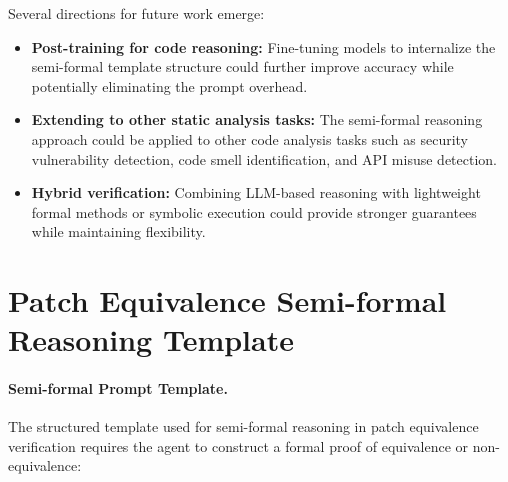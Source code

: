\documentclass[]{meta}
\begin{document}
Several directions for future work emerge:
\begin{itemize}


    \item \textbf{Post-training for code reasoning:} Fine-tuning models to internalize the semi-formal template structure could further improve accuracy while potentially eliminating the prompt overhead.

    \item \textbf{Extending to other static analysis tasks:} The semi-formal reasoning approach could be applied to other code analysis tasks such as security vulnerability detection, code smell identification, and API misuse detection.

    \item \textbf{Hybrid verification:} Combining LLM-based reasoning with lightweight formal methods or symbolic execution could provide stronger guarantees while maintaining flexibility.
\end{itemize}




\appendix
\section{Patch Equivalence Semi-formal Reasoning Template}
\label{app:patch-equiv}

\paragraph{Semi-formal Prompt Template.}
The structured template used for semi-formal reasoning in patch equivalence verification requires the agent to construct a formal proof of equivalence or non-equivalence:
\end{document}
